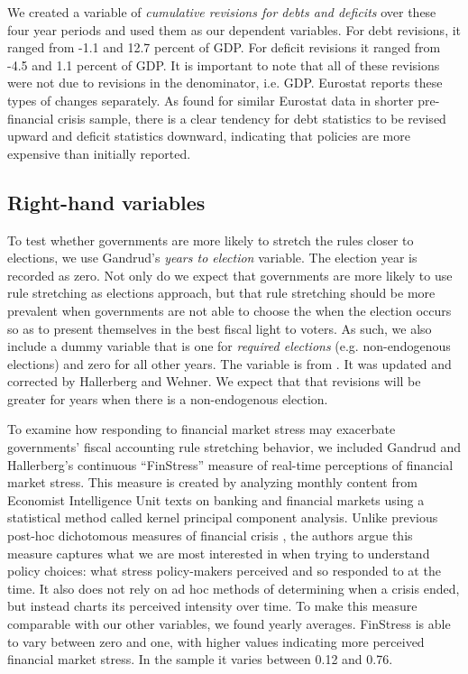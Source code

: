 \documentclass[]{article}
\begin{document}
We created a variable of \emph{cumulative revisions for debts and deficits} over these four year periods and used them as our dependent variables. For debt revisions, it ranged from -1.1 and 12.7 percent of GDP. For deficit revisions it ranged from -4.5 and 1.1 percent of GDP. It is important to note that all of these revisions were not due to revisions in the denominator, i.e. GDP. Eurostat reports these types of changes separately. As \cite{DeCastro2013} found for similar Eurostat data in shorter pre-financial crisis sample, there is a clear tendency for debt statistics to be revised upward and deficit statistics downward, indicating that policies are more expensive than initially reported.

\subsection{Right-hand variables}

To test whether governments are more likely to stretch the rules closer to elections, we use Gandrud's \citeyearpar{gandrudYrcurnt} \emph{years to election} variable. The election year is recorded as zero. Not only do we expect that governments are more likely to use rule stretching as elections approach, but that rule stretching should be more prevalent when governments are not able to choose the when the election occurs so as to present themselves in the best fiscal light to voters. As such, we also include a dummy variable that is one for \emph{required elections} (e.g. non-endogenous elections) and zero for all other years. The variable is from \cite{Brender2008}. It was updated and corrected by Hallerberg and Wehner. We expect that that revisions will be greater for years when there is a non-endogenous election.

To examine how responding to financial market stress may exacerbate governments' fiscal accounting rule stretching behavior, we included Gandrud and Hallerberg's \citeyearpar{finstress_paper} continuous ``FinStress'' measure of real-time perceptions of financial market stress. This measure is created by analyzing monthly content from Economist Intelligence Unit texts on banking and financial markets using a statistical method called kernel principal component analysis. Unlike previous post-hoc dichotomous measures of financial crisis \citep[e.g. measures compiled by][]{Laeven2012,ReinhartRog2010}, the authors argue this measure captures what we are most interested in when trying to understand policy choices: what stress policy-makers perceived and so responded to at the time. It also does not rely on ad hoc methods of determining when a crisis ended, but instead charts its perceived intensity over time. To make this measure comparable with our other variables, we found yearly averages. FinStress is able to vary between zero and one, with higher values indicating more perceived financial market stress. In the sample it varies between 0.12 and 0.76.
\end{document}
